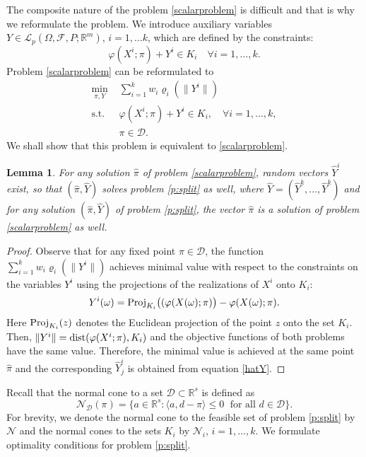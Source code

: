 \documentclass[10pt,letterpaper]{article}
\newcommand{\R}{\mathbb{R}}
\newcommand{\Dc}{\mathcal{D}}
\newcommand{\1}{1{\hskip -2.55 pt}\hbox{I}}
\newcommand{\dist}{\mathop{\rm dist}}
\newtheorem{proof}{Proof}
\newtheorem{lemma}[theorem]{Lemma}
\begin{document}
The composite nature of the problem \eqref{scalarproblem} is difficult and that is why we reformulate the problem. We introduce auxiliary variables 
$Y\in\mathcal L_p(\varOmega, \mathcal F, P;\R^{m})$, $i=1,\dots k$, which are defined by the constraints:
\[
\varphi(X^i;\pi)+Y^i \in K_i \quad \forall i=1,\dots, k. 
\]
Problem \eqref{scalarproblem} can be reformulated to
\begin{equation}
\label{p:split}
\begin{aligned}
\min_{\pi,Y}\, &\,\sum_{i=1}^k w_i\varrho_i(\|Y^i\|)\\
\text{s.t. }  &\, \varphi(X^i;\pi)+Y^i\in K_i, \quad \forall i=1,\dots, k,\\
&\, \pi\in\Dc.
\end{aligned} 
\end{equation}
We shall show that this problem is equivalent to \eqref{scalarproblem}. 
\begin{lemma}
For any solution $\hat{\pi}$ of problem \eqref{scalarproblem}, random vectors $\hat{Y}^i$ exist, so that $(\hat{\pi},\hat{Y})$ solves problem \eqref{p:split} as well,
where $\hat{Y}= (\hat{Y}^k,\dots, \hat{Y}^k)$ and for any solution $(\hat{\pi},\hat{Y})$ of problem \eqref{p:split}, the vector $\hat{\pi}$ is a solution of problem \eqref{scalarproblem} as well.
\end{lemma}
\label{l:equiv}
\begin{proof}
Observe that for any fixed point $\pi\in\Dc$, the function $\sum_{i=1}^k w_i\varrho_i(\|Y^i\|)$ achieves minimal value with respect to the constraints on the variables $Y^i$ using the projections of the realizations of $X^i$ onto $K_i$:
\begin{equation}
\label{hatY}
Y^i (\omega) = {\rm Proj}_{K_i}\big((\varphi(X(\omega);{\pi})\big)  - \varphi(X(\omega);{\pi}). 
\end{equation}
Here ${\rm Proj}_{K_i}(z)$ denotes the Euclidean projection of the point $z$ onto the set $K_i.$
Then, $\|Y^i \|= \dist(\varphi(X^i;\pi),K_i)$ and the objective functions of both problems have the same value. 
Therefore, the minimal value is achieved at the same point $\hat{\pi}$ and the corresponding  $\hat{Y}^i_j$ is obtained from
equation \eqref{hatY}.
\end{proof}
Recall that the normal cone to a set $\Dc\subset \R^s$ is defined as 
\[
\mathcal{N}_{\Dc}(\pi) = \{a\in\R^s: \langle a, d - \pi\rangle \leq 0\;\text{ for all } d\in\Dc\}.
\]
For brevity, we denote the normal cone to the feasible set of problem \eqref{p:split} by $\mathcal{N}$ and the normal cones to the sets $K_i$ by
$\mathcal{N}_i$, $i=1,\dots, k$. 
We formulate optimality conditions for problem \eqref{p:split}.
\end{document}
